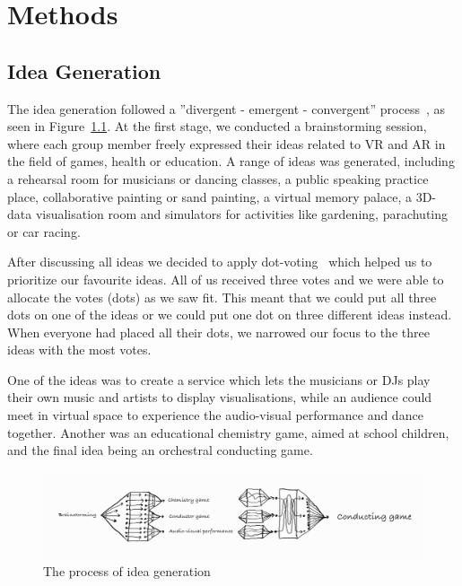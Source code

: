 \chapter{Methods} \label{chap:methods}
\section{Idea Generation} 
The idea generation followed a ''divergent - emergent - convergent'' process~\cite{gameBook}, as seen in Figure~\ref{fig:ideaGeneration}. At the first stage, we conducted a brainstorming session, where each group member freely expressed their ideas related to VR and AR in the field of games, health or education. A range of ideas was generated, including a rehearsal room for musicians or dancing classes, a public speaking practice place, collaborative painting or sand painting, a virtual memory palace, a 3D-data visualisation room and simulators for activities like gardening, parachuting or car racing. 

After discussing all ideas we decided to apply dot-voting~\cite{gameBook} which helped us to prioritize our favourite ideas. All of us received three votes and we were able to allocate the votes (dots) as we saw fit. This meant that we could put all three dots on one of the ideas or we could put one dot on three different ideas instead. When everyone had placed all their dots, we narrowed our focus to the three ideas with the most votes. 

One of the ideas was to create a service which lets the musicians or DJs play their own music and artists to display visualisations, while an audience could meet in virtual space to experience the audio-visual performance and dance together. Another was an educational chemistry game, aimed at school children, and the final idea being an orchestral conducting game.

\begin{figure}[tbph]
    \centering
    \includegraphics[width=1.0\textwidth]{images/ideaGenerationProcess.png}
    \caption[Idea Generation Process]{The process of idea generation~\cite{gameBook}}
    \label{fig:ideaGeneration}
\end{figure}

